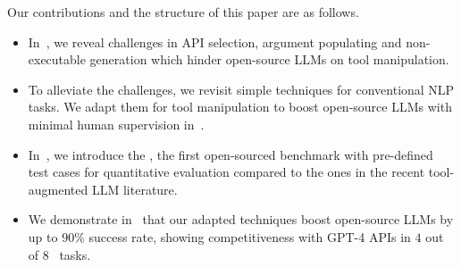 


Our contributions and the structure of this paper are as follows.
\begin{itemize}[leftmargin=*]
\item In~, we reveal challenges in API selection, argument populating and non-executable generation which hinder open-source LLMs on tool manipulation.
\item To alleviate the challenges, we revisit simple techniques for conventional NLP tasks. We adapt them for tool manipulation to boost open-source LLMs with minimal human supervision in~.
\item In~, we introduce the \snact, the first open-sourced benchmark with pre-defined test cases for quantitative evaluation compared to the ones in the recent tool-augmented LLM literature. 
\item We demonstrate in~ that our adapted techniques boost open-source LLMs by up to $90\%$ success rate, showing competitiveness with GPT-4 APIs in $4$ out of $8$ \snact\  tasks.
\end{itemize}
